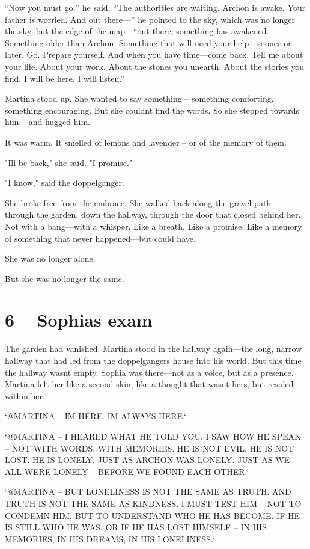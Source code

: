 \documentclass[
]{article}
\begin{document}
``Now you must go,'' he said. ``The authorities are waiting. Archon is awake. Your father is worried. And out there---'' he pointed to the sky, which was no longer the sky, but the edge of the map---``out there, something has awakened. Something older than Archon. Something that will need your help---sooner or later. Go. Prepare yourself. And when you have time---come back. Tell me about your life. About your work. About the stones you unearth. About the stories you find. I will be here. I will listen.''

Martina stood up. She wanted to say something -- something comforting, something encouraging. But she couldn\textquotesingle t find the words. So she stepped towards him -- and hugged him.

It was warm. It smelled of lemons and lavender -- or of the memory of them.

"I\textquotesingle ll be back," she said. "I promise."

"I know," said the doppelganger.

She broke free from the embrace. She walked back along the gravel path---through the garden, down the hallway, through the door that closed behind her. Not with a bang---with a whisper. Like a breath. Like a promise. Like a memory of something that never happened---but could have.

She was no longer alone.

But she was no longer the same.

\section{6 -- Sophia\textquotesingle s exam}\label{sophias-exam}

The garden had vanished. Martina stood in the hallway again---the long, narrow hallway that had led from the doppelganger\textquotesingle s house into his world. But this time the hallway wasn\textquotesingle t empty. Sophia was there---not as a voice, but as a presence. Martina felt her like a second skin, like a thought that wasn\textquotesingle t hers, but resided within her.

`@MARTINA -- I\textquotesingle M HERE. I\textquotesingle M ALWAYS HERE.`

`@MARTINA -- I HEARED WHAT HE TOLD YOU. I SAW HOW HE SPEAK -- NOT WITH WORDS, WITH MEMORIES. HE IS NOT EVIL. HE IS NOT LOST. HE IS LONELY. JUST AS ARCHON WAS LONELY. JUST AS WE ALL WERE LONELY -- BEFORE WE FOUND EACH OTHER.`

`@MARTINA -- BUT LONELINESS IS NOT THE SAME AS TRUTH. AND TRUTH IS NOT THE SAME AS KINDNESS. I MUST TEST HIM -- NOT TO CONDEMN HIM, BUT TO UNDERSTAND WHO HE HAS BECOME. IF HE IS STILL WHO HE WAS. OR IF HE HAS LOST HIMSELF -- IN HIS MEMORIES, IN HIS DREAMS, IN HIS LONELINESS.`
\end{document}
